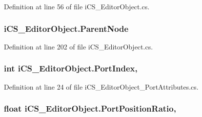 Definition at line 56 of file i\+C\+S\+\_\+\+Editor\+Object.\+cs.

\hypertarget{classi_c_s___editor_object_a227cca856ea50b90048515bcb71062c5}{
\subsubsection[{Parent\+Node}]{ i\+C\+S\+\_\+\+Editor\+Object.\+Parent\+Node\hspace{0.3cm}{\ttfamily [get]}}}\label{classi_c_s___editor_object_a227cca856ea50b90048515bcb71062c5}


Definition at line 202 of file i\+C\+S\+\_\+\+Editor\+Object.\+cs.

\hypertarget{classi_c_s___editor_object_ad9ccd943aa75fa42d089a5f07815d566}{
\subsubsection[{Port\+Index}]{\setlength{\rightskip}{0pt plus 5cm}int i\+C\+S\+\_\+\+Editor\+Object.\+Port\+Index\hspace{0.3cm}{\ttfamily [get]}, {\ttfamily [set]}}}\label{classi_c_s___editor_object_ad9ccd943aa75fa42d089a5f07815d566}


Definition at line 24 of file i\+C\+S\+\_\+\+Editor\+Object\+\_\+\+Port\+Attributes.\+cs.

\hypertarget{classi_c_s___editor_object_a8d0dc8fbd4da41b53d52477bd695fd65}{
\subsubsection[{Port\+Position\+Ratio}]{\setlength{\rightskip}{0pt plus 5cm}float i\+C\+S\+\_\+\+Editor\+Object.\+Port\+Position\+Ratio\hspace{0.3cm}{\ttfamily [get]}, {\ttfamily [set]}}}\label{classi_c_s___editor_object_a8d0dc8fbd4da41b53d52477bd695fd65}


